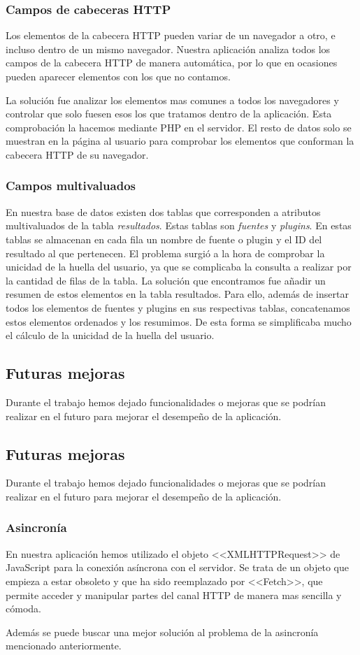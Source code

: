 \subsubsection{Campos de cabeceras HTTP}
Los elementos de la cabecera HTTP pueden variar de un navegador a otro, e incluso dentro de un mismo navegador. Nuestra aplicación analiza todos los campos de la cabecera HTTP de manera automática, por lo que en ocasiones pueden aparecer elementos con los que no contamos.\par 
La solución fue analizar los elementos mas comunes a todos los navegadores y controlar que solo fuesen esos los que tratamos dentro de la aplicación. Esta comprobación la hacemos mediante PHP en el servidor. El resto de datos solo se muestran en la página al usuario para comprobar los elementos que conforman la cabecera HTTP de su navegador.
\subsubsection{Campos multivaluados}
En nuestra base de datos existen dos tablas que corresponden a atributos multivaluados de la tabla \textit{resultados}. Estas tablas son \textit{fuentes} y \textit{plugins}. En estas tablas se almacenan en cada fila un nombre de fuente o plugin y el ID del resultado al que pertenecen. El problema surgió a la hora de comprobar la unicidad de la huella del usuario, ya que se complicaba la consulta a realizar por la cantidad de filas de la tabla. La solución que encontramos fue añadir un resumen de estos elementos en la tabla resultados. Para ello, además de insertar todos los elementos de fuentes y plugins en sus respectivas tablas, concatenamos estos elementos ordenados y los resumimos. De esta forma se simplificaba mucho el cálculo de la unicidad de la huella del usuario.
\subsection{Futuras mejoras}
Durante el trabajo hemos dejado funcionalidades o mejoras que se podrían realizar en el futuro para mejorar el desempeño de la aplicación.
\subsection{Futuras mejoras}
Durante el trabajo hemos dejado funcionalidades o mejoras que se podrían realizar en el futuro para mejorar el desempeño de la aplicación.
\subsubsection{Asincronía}
En nuestra aplicación hemos utilizado el objeto <<XMLHTTPRequest>> de JavaScript para la conexión asíncrona con el servidor. Se trata de un objeto que empieza a estar obsoleto y que ha sido reemplazado por <<Fetch>>, que permite acceder y manipular partes del canal HTTP de manera mas sencilla y cómoda.\par 
Además se puede buscar una mejor solución al problema de la asincronía mencionado anteriormente.
